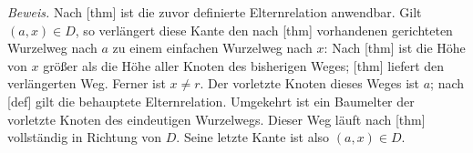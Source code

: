 \begin{tabproofwide}
\end{tabproofwide}

\noindent\begin{minipage}{\linewidth}
\end{minipage}\par
\noindent\textit{Beweis.}
Nach [thm] ist die
zuvor definierte Elternrelation anwendbar. Gilt \((a,x)\in D\), so verlängert
diese Kante den nach [thm]
vorhandenen gerichteten Wurzelweg nach \(a\) zu einem einfachen
Wurzelweg nach \(x\): Nach [thm] ist die Höhe von \(x\) größer als die Höhe aller
Knoten des bisherigen Weges; [thm] liefert den verlängerten Weg. Ferner ist \(x\neq r\). Der vorletzte
Knoten dieses Weges ist \(a\); nach
[def] gilt die behauptete Elternrelation.
Umgekehrt ist ein Baumelter der vorletzte Knoten des eindeutigen
Wurzelwegs. Dieser Weg läuft nach
[thm] vollständig in Richtung von \(D\). Seine letzte Kante ist also
\((a,x)\in D\).
